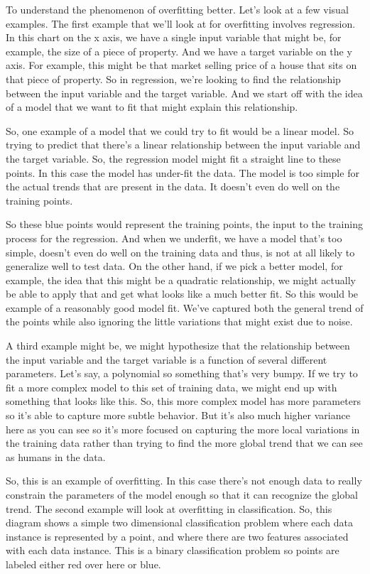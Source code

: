 \begin{multicols}{2}
To understand the phenomenon of overfitting better. Let's look at a few visual examples. The first example that we'll look at for overfitting involves regression. In this chart on the x axis, we have a single input variable that might be, for example, the size of a piece of property. And we have a target variable on the y axis. For example, this might be that market selling price of a house that sits on that piece of property. So in regression, we're looking to find the relationship between the input variable and the target variable. And we start off with the idea of a model that we want to fit that might explain this relationship. 

So, one example of a model that we could try to fit would be a linear model. So trying to predict that there's a linear relationship between the input variable and the target variable. So, the regression model might fit a straight line to these points. In this case the model has under-fit the data. The model is too simple for the actual trends that are present in the data. It doesn't even do well on the training points. 

So these blue points would represent the training points, the input to the training process for the regression. And when we underfit, we have a model that's too simple, doesn't even do well on the training data and thus, is not at all likely to generalize well to test data. On the other hand, if we pick a better model, for example, the idea that this might be a quadratic relationship, we might actually be able to apply that and get what looks like a much better fit. So this would be example of a reasonably good model fit. We've captured both the general trend of the points while also ignoring the little variations that might exist due to noise. 

A third example might be, we might hypothesize that the relationship between the input variable and the target variable is a function of several different parameters. Let's say, a polynomial so something that's very bumpy. If we try to fit a more complex model to this set of training data, we might end up with something that looks like this. So, this more complex model has more parameters so it's able to capture more subtle behavior. But it's also much higher variance here as you can see so it's more focused on capturing the more local variations in the training data rather than trying to find the more global trend that we can see as humans in the data. 

So, this is an example of overfitting. In this case there's not enough data to really constrain the parameters of the model enough so that it can recognize the global trend. The second example will look at overfitting in classification. So, this diagram shows a simple two dimensional classification problem where each data instance is represented by a point, and where there are two features associated with each data instance. This is a binary classification problem so points are labeled either red over here or blue. 


\end{multicols}
